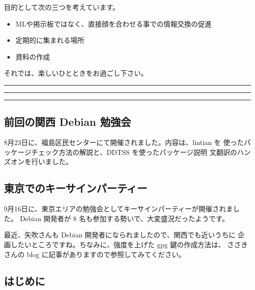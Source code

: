 \documentclass[mingoth,a4paper]{jsarticle}
\begin{document}
 目的として次の三つを考えています。
 \begin{itemize}
  \item MLや掲示板ではなく、直接顔を合わせる事での情報交換の促進
  \item 定期的に集まれる場所
  \item 資料の作成
 \end{itemize}

 それでは、楽しいひとときをお過ごし下さい。

\newpage

\begin{minipage}[b]{0.2\hsize}
 {}
\end{minipage}
\begin{minipage}[b]{0.8\hsize}
\hrule
\vspace{2mm}
\hrule
\setcounter{tocdepth}{1}
\tableofcontents
\vspace{2mm}
\hrule
\end{minipage}


\subsection{前回の関西 Debian 勉強会}

8月23日に、福島区民センターにて開催されました。内容は、lintian を
使ったパッケージチェック方法の解説と、DDTSS を使ったパッケージ説明
文翻訳のハンズオンを行いました。


\subsection{東京でのキーサインパーティー}

9月16日に、東京エリアの勉強会としてキーサインパーティーが開催されました。
Debian 開発者が 8 名も参加する勢いで、大変盛況だったようです。

最近、矢吹さんも Debian 開発者になられましたので、関西でも近いうちに
企画したいところですね。ちなみに、強度を上げた gpg 鍵の作成方法は、
ささきさんの blog に記事がありますので参照してみてください。


\subsection{はじめに}
\end{document}
